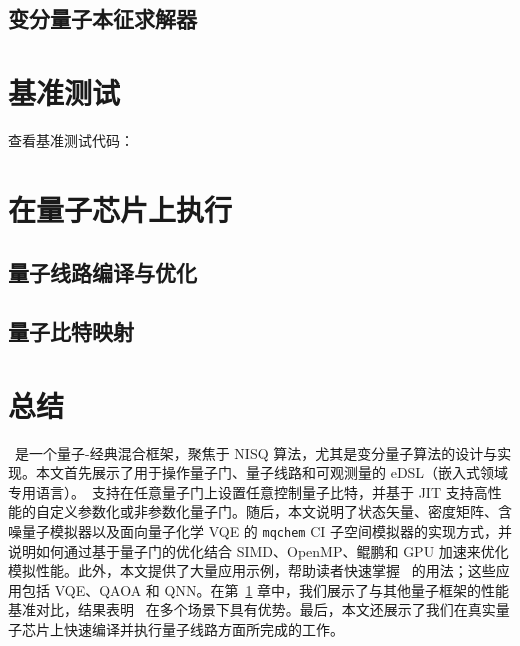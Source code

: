 \documentclass[pra,twocolumn,superscriptaddress,floatfix,nofootinbib,amsmath,amssymb]{revtex4-1}
\numberwithin{equation}{section}
\numberwithin{figure}{section}
\numberwithin{table}{section}
\begin{document}
\subsection{变分量子本征求解器}





\section{基准测试}
\label{sec:benchmark}

查看基准测试代码：\href{https://gitee.com/mindspore/mindquantum/blob/research/whitepaper/code/benchmark}{\color{ceruleanblue}{CPU}} \href{https://gitee.com/mindspore/mindquantum/blob/research/whitepaper/code/benchmark_gpu}{\color{ceruleanblue}{GPU}}




\section{在量子芯片上执行}
\label{sec:chip}
\subsection{量子线路编译与优化}


\subsection{量子比特映射}


% 

% 

\section{总结}
\label{sec:summary}
\MindQuantum\ 是一个量子-经典混合框架，聚焦于 NISQ 算法，尤其是变分量子算法的设计与实现。本文首先展示了用于操作量子门、量子线路和可观测量的 eDSL（嵌入式领域专用语言）。\MindQuantum\ 支持在任意量子门上设置任意控制量子比特，并基于 JIT 支持高性能的自定义参数化或非参数化量子门。随后，本文说明了状态矢量、密度矩阵、含噪量子模拟器以及面向量子化学 VQE 的 \texttt{mqchem} CI 子空间模拟器的实现方式，并说明如何通过基于量子门的优化结合 SIMD、OpenMP、鲲鹏和 GPU 加速来优化模拟性能。此外，本文提供了大量应用示例，帮助读者快速掌握 \MindQuantum\ 的用法；这些应用包括 VQE、QAOA 和 QNN。在第~\ref{sec:benchmark} 章中，我们展示了与其他量子框架的性能基准对比，结果表明 \MindQuantum\ 在多个场景下具有优势。最后，本文还展示了我们在真实量子芯片上快速编译并执行量子线路方面所完成的工作。
\end{document}
